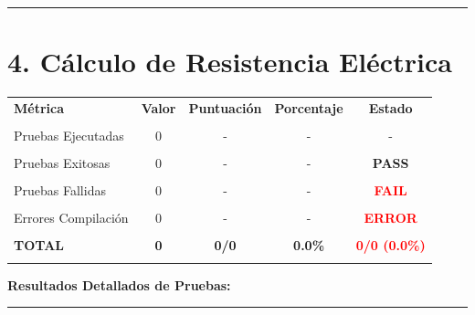 \documentclass[11pt]{article}
\begin{document}
\vspace{0.5cm}
\hrule
\vspace{0.3cm}


\vspace{0.5cm}
\section*{\textbf{4.} Cálculo de Resistencia Eléctrica}


\begin{table}[h!]
\centering
\begin{tabular}{l|c|c|c|c}
\hline
\rowcolor{lightgray}
\textbf{Métrica} & \textbf{Valor} & \textbf{Puntuación} & \textbf{Porcentaje} & \textbf{Estado} \\\\
\hline
Pruebas Ejecutadas & 0 & - & - & - \\\\
Pruebas Exitosas & 0 & - & - & \textcolor{commentgreen}{\textbf{PASS}} \\\\
Pruebas Fallidas & 0 & - & - & \textcolor{red}{\textbf{FAIL}} \\\\
Errores Compilación & 0 & - & - & \textcolor{red}{\textbf{ERROR}} \\\\
\hline
\rowcolor{lightgray}
\textbf{TOTAL} & \textbf{0} & \textbf{0/0} & \textbf{0.0\%} & \textcolor{red}{\textbf{0/0 (0.0\%)}} \\\\
\hline
\end{tabular}
\end{table}


\vspace{0.5cm}
\textbf{Resultados Detallados de Pruebas:}\\[0.3cm]
\begin{center}
%
\end{center}

\vspace{0.5cm}
\hrule
\vspace{0.3cm}
\end{document}
